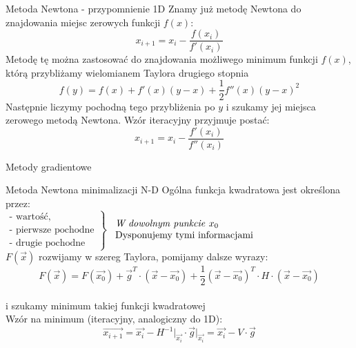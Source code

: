 
\begin{frame}{Metoda Newtona - przypomnienie 1D}
Znamy już metodę Newtona do znajdowania miejsc zerowych funkcji $f(x)$:
$$
x_{i+1}=x_i - \frac{f(x_i)}{f'(x_i)}
$$
Metodę tę można zastosować do znajdowania  możliwego minimum funkcji $f(x)$, którą przybliżamy wielomianem Taylora drugiego stopnia 
$$
f(y)=f(x)+f'(x)(y-x)+\frac{1}{2}f''(x)(y-x)^2
$$
Następnie liczymy pochodną  tego przybliżenia po $y$ i szukamy jej miejsca zerowego metodą Newtona. Wzór iteracyjny przyjmuje postać:
$$
x_{i+1}=x_i - \frac{f'(x_i)}{f''(x_i)}
$$
\end{frame}
  \begin{frame}{Metody gradientowe}

    \begin{block}{Metoda Newtona minimalizacji N-D}
      Ogólna funkcja kwadratowa jest określona przez:
      \\$\left.
        \begin{array}{l}
          \text{- wartość,} \\
          \text{- pierwsze pochodne} \\
          \text{- drugie pochodne}
	    \end{array}
	  \right\}$
	  $\begin{array}{l} \text{\emph{W dowolnym punkcie }} x_0 \\
     \text{Dysponujemy tymi informacjami} \end{array}$\\
    $F(\vec{x})$ rozwijamy w szereg Taylora, pomijamy dalsze wyrazy:
	  \begin{displaymath}
	  		F(\vec{x}) = F(\vec{x_0}) + \vec{g}^T \cdot (\vec{x} - \vec{x_0}) +
	  		\frac{1}{2} (\vec{x} - \vec{x_0})^T \cdot H \cdot (\vec{x} - \vec{x_0})
	  \end{displaymath}
	  \\i szukamy minimum takiej funkcji kwadratowej
	  \\Wzór na minimum (iteracyjny, analogiczny do 1D):
	  \begin{displaymath}
	  		\vec{x_{i+1}} = \vec{x_i} - H^{-1}\vert_{\vec{x_i}} \cdot \vec{g}\vert_{\vec{x_i}} =  \vec{x_i} - V \cdot \vec{g}
	  \end{displaymath}
	\end{block}

  \end{frame}

